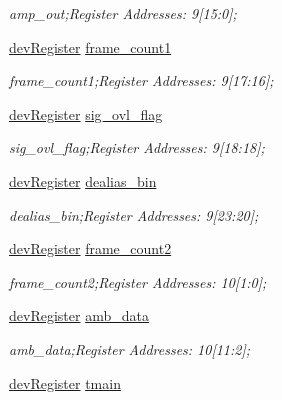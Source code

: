 \begin{DoxyCompactItemize}
\begin{DoxyCompactList}\small\item\em amp\+\_\+out;Register Addresses\+: 9\mbox{[}15\+:0\mbox{]}; \end{DoxyCompactList}\item 
\mbox{\hyperlink{classdev_register}{dev\+Register}} \mbox{\hyperlink{class_o_p_t3101_registers_aec28c94802ec5e96c376c43501e68fed}{frame\+\_\+count1}}
\begin{DoxyCompactList}\small\item\em frame\+\_\+count1;Register Addresses\+: 9\mbox{[}17\+:16\mbox{]}; \end{DoxyCompactList}\item 
\mbox{\hyperlink{classdev_register}{dev\+Register}} \mbox{\hyperlink{class_o_p_t3101_registers_a805601dd7d269f4ff71d0d706468c19e}{sig\+\_\+ovl\+\_\+flag}}
\begin{DoxyCompactList}\small\item\em sig\+\_\+ovl\+\_\+flag;Register Addresses\+: 9\mbox{[}18\+:18\mbox{]}; \end{DoxyCompactList}\item 
\mbox{\hyperlink{classdev_register}{dev\+Register}} \mbox{\hyperlink{class_o_p_t3101_registers_a08680c4a650e6ea92f28617ebd151757}{dealias\+\_\+bin}}
\begin{DoxyCompactList}\small\item\em dealias\+\_\+bin;Register Addresses\+: 9\mbox{[}23\+:20\mbox{]}; \end{DoxyCompactList}\item 
\mbox{\hyperlink{classdev_register}{dev\+Register}} \mbox{\hyperlink{class_o_p_t3101_registers_a230eade1396a6b082c54c675d1ad9ed3}{frame\+\_\+count2}}
\begin{DoxyCompactList}\small\item\em frame\+\_\+count2;Register Addresses\+: 10\mbox{[}1\+:0\mbox{]}; \end{DoxyCompactList}\item 
\mbox{\hyperlink{classdev_register}{dev\+Register}} \mbox{\hyperlink{class_o_p_t3101_registers_a096c1c1a754ad15df12a9a3fda98fb00}{amb\+\_\+data}}
\begin{DoxyCompactList}\small\item\em amb\+\_\+data;Register Addresses\+: 10\mbox{[}11\+:2\mbox{]}; \end{DoxyCompactList}\item 
\mbox{\hyperlink{classdev_register}{dev\+Register}} \mbox{\hyperlink{class_o_p_t3101_registers_a864b8c40d5fa5d8dcf7e5fd49bfa889a}{tmain}}

\end{DoxyCompactItemize}
